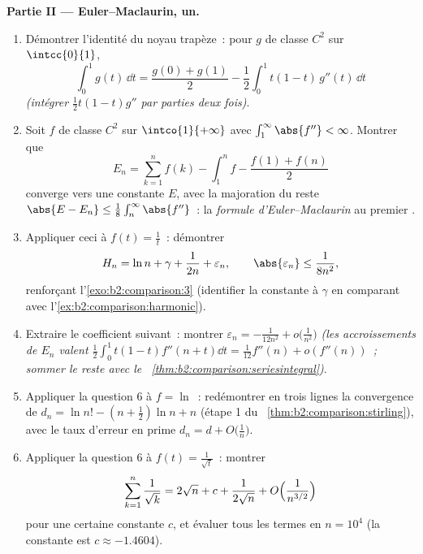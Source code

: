 \begin{problem}
\medskip
\noindent\textbf{Partie II --- Euler--Maclaurin,  un.}
\begin{enumerate}[resume]
  \item Démontrer l'identité du noyau trapèze~: pour $g$ de classe
        $C^2$ sur $\intcc{0}{1}$,
        \[
        \int_0^1 g(t)\,\dd t = \frac{g(0) + g(1)}{2}
        - \frac12\int_0^1 t(1 - t)\,g''(t)\,\dd t
        \]
        \emph{(intégrer $\frac12 t(1-t)g''$ par parties deux fois)}.
  \item Soit $f$ de classe $C^2$ sur $\intco{1}{+\infty}$ avec
        $\int_1^\infty \abs{f''} < \infty$. Montrer que
        \[
        E_n = \sum_{k=1}^{n} f(k) - \int_1^n f -
        \frac{f(1) + f(n)}{2}
        \]
        converge vers une constante $E$, avec la majoration du reste
        $\abs{E - E_n} \leq \frac18\int_n^\infty\abs{f''}$~: la
        \emph{formule d'Euler--Maclaurin} au premier .
  \item Appliquer ceci à $f(t) = \frac1t$~: démontrer
        \[
        H_n = \ln n + \gamma + \frac{1}{2n} + \varepsilon_n,
        \qquad \abs{\varepsilon_n} \leq \frac{1}{8n^2},
        \]
        renforçant l'\cref{exo:b2:comparison:3} (identifier la
        constante à $\gamma$ en comparant avec
        l'\cref{ex:b2:comparison:harmonic}).
  \item Extraire le coefficient suivant~: montrer $\varepsilon_n =
        -\frac{1}{12n^2} + o\bigl(\frac1{n^2}\bigr)$
        \emph{(les accroissements de $E_n$ valent
        $\frac12\int_0^1t(1-t)f''(n+t)\dd t =
        \frac1{12}f''(n) + o(f''(n))$~; sommer le reste avec le~%
        \cref{thm:b2:comparison:seriesintegral})}.
  \item Appliquer la question 6 à $f = \ln$~: redémontrer en trois
        lignes la convergence de $d_n = \ln n! - (n +
        \frac12)\ln n + n$ (étape 1 du~%
        \cref{thm:b2:comparison:stirling}), avec le taux d'erreur en
        prime $d_n = d + O\bigl(\frac1n\bigr)$.
  \item Appliquer la question 6 à $f(t) = \frac{1}{\sqrt t}$~: montrer
        \[
        \sum_{k=1}^{n}\frac1{\sqrt k} = 2\sqrt n + c +
        \frac{1}{2\sqrt n} + O\Bigl(\frac{1}{n^{3/2}}\Bigr)
        \]
        pour une certaine constante $c$, et évaluer tous les termes en
        $n = 10^4$ (la constante est $c \approx -1.4604$).
\end{enumerate}


\end{problem}
